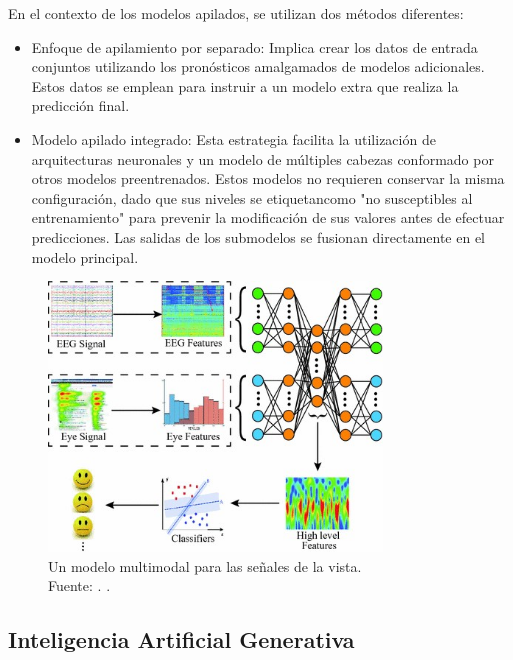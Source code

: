 En el contexto de los modelos apilados, se utilizan dos métodos diferentes:

\begin{itemize}
    \item Enfoque de apilamiento por separado: Implica crear los datos de entrada conjuntos utilizando los pronósticos amalgamados de modelos adicionales. Estos datos se emplean para instruir a un modelo extra que realiza la predicción final.
	\item Modelo apilado integrado: Esta estrategia facilita la utilización de arquitecturas neuronales y un modelo de múltiples cabezas conformado por otros modelos preentrenados. Estos modelos no requieren conservar la misma configuración, dado que sus niveles se etiquetancomo "no susceptibles al entrenamiento" para prevenir la modificación de sus valores antes de efectuar predicciones. Las salidas de los submodelos se fusionan directamente en el modelo principal.
\end{itemize}

\begin{figure}[!ht]
	\begin{center}
		\includegraphics[width=0.79\textwidth]{2/figures/multimodal_deep_learning_example.jpg}
		\caption[Un modelo multimodal para las señales de la vista]{Un modelo multimodal para las señales de la vista.\\
		Fuente: \cite{tec_baheti2020introduction_mdl}. .}
		\label{2:fig7}
	\end{center}
\end{figure}

\subsection{Inteligencia Artificial Generativa}

